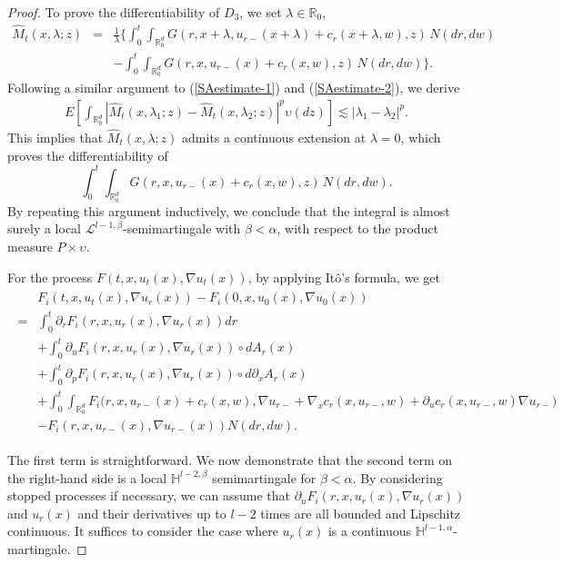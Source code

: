 \documentclass[12pt,oneside, reqno]{amsart}
\newcommand{\be}{\begin{eqnarray}}
\newcommand{\ee}{\end{eqnarray}}
\newcommand{\ce}{\begin{eqnarray*}}
\newcommand{\de}{\end{eqnarray*}}
\def\mH{{\mathbb H}}
\def\mR{{\mathbb R}}
\def\sL{{\mathscr L}}
\numberwithin{equation}{section}
\begin{document}
\begin{proof}
 To prove the differentiability of $D_3$, we set $\lambda\in \mR_0$, 
\ce 
\hat{M}_t(x,\lambda;z)&=&\frac{1}{\lambda}\bigg\{\int_0^t\int_{\mR^d_0}
G(r,x+\lambda,u_{r-}(x+\lambda)+c_r(x+\lambda,w),z)\,N(dr,dw)\\
&&-\int_0^t\int_{\mR^d_0}
G(r,x,u_{r-}(x)+c_r(x,w),z)\,N(dr,dw)\bigg\}.
\de 
Following a similar argument to (\ref{SAestimate-1}) and (\ref{SAestimate-2}), we derive
\ce 
E[\int_{\mR^d_0}|\hat{M}_t(x,\lambda_1;z)-\hat{M}_t(x,\lambda_2;z)|^p \upsilon(dz)]\lesssim |\lambda_1-\lambda_2|^p.
\de 
This implies that $\hat{M}_t(x,\lambda;z)$ admits a continuous extension at  $\lambda=0$, which proves the differentiability of $$\int_0^t\int_{\mR^d_0}
G(r,x,u_{r-}(x)+c_r(x,w),z)\,N(dr,dw).$$  By repeating this argument inductively, we conclude that the integral is almost surely a local $\sL^{l-1,\beta}$-semimartingale with $\beta<\alpha$, with respect to the product measure  $P\times \upsilon$.



For the process $F(t,x,u_t(x),\nabla u_t(x))$, by applying It\^{o}'s formula, we get 
\be\label{Itoformula-F} 
\begin{split}
&F_i(t,x,u_t(x),\nabla u_r(x))-F_i(0,x,u_0(x),\nabla u_0(x))\\
=&\int_0^t\partial_rF_i(r,x,u_r(x),\nabla u_r(x))dr \\
&+\int_0^t \partial_u F_i(r,x,u_r(x),\nabla u_r(x)) \circ dA_r(x)\\
&+\int_0^t \partial_{p} F_i(r,x,u_r(x),\nabla u_r(x)) \circ d\partial_{x}A_r(x)\\
&+\int_0^t\int_{\mR^d_0} F_i\big(r,x,u_{r-}(x)+c_r(x,w),\nabla u_{r-}
+\nabla_xc_r(x,u_{r-},w)
+\partial_uc_r(x,u_{r-},w)\nabla u_{r-}\big)\\
&- F_i(r,x,u_{r-}(x),\nabla u_{r-}(x))  N(dr,dw). 
\end{split}
\ee




The first term is straightforward. We now demonstrate that the second term on the right-hand side is a local  $\mH^{l-2,\beta}$ semimartingale for $\beta<\alpha$.  By considering stopped processes if necessary, we can assume that $\partial_u F_i(r,x,u_r(x),\nabla u_r(x))$ and $u_r(x)$ and their derivatives up to $l-2$ times are all bounded and Lipschitz continuous. It suffices to consider the case where  $u_r(x)$ is a continuous $\mH^{l-1,\alpha}$-martingale.


\end{proof}
\end{document}
